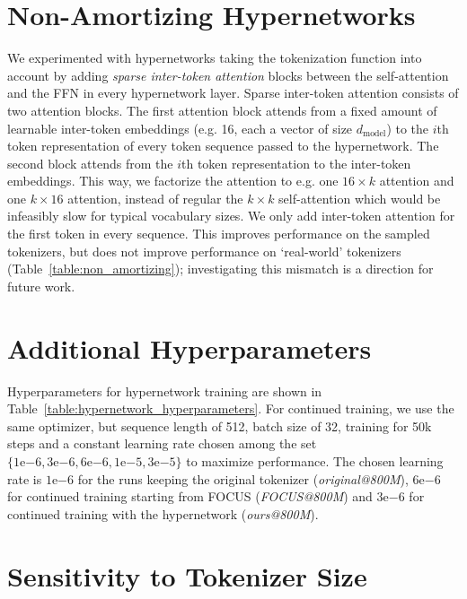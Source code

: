\documentclass{article}
\begin{document}
\section{Non-Amortizing Hypernetworks}
\label{appendix:nonamortizing}



We experimented with hypernetworks taking the tokenization function into account by adding \textit{sparse inter-token attention} blocks between the self-attention and the FFN in every hypernetwork layer. Sparse inter-token attention consists of two attention blocks. The first attention block attends from a fixed amount of learnable inter-token embeddings (e.g. 16, each a vector of size $d_{\text{model}}$) to the $i$th token representation of every token sequence passed to the hypernetwork. The second block attends from the $i$th token representation to the inter-token embeddings. This way, we factorize the attention to e.g. one $16 \times k$ attention and one $k \times 16$ attention, instead of regular the $k \times k$ self-attention which would be infeasibly slow for typical vocabulary sizes. We only add inter-token attention for the first token in every sequence. This improves performance on the sampled tokenizers, but does not improve performance on `real-world' tokenizers (Table~\ref{table:non_amortizing}); investigating this mismatch is a direction for future work.

\section{Additional Hyperparameters}
\label{appendix:hyperparameters}

Hyperparameters for hypernetwork training are shown in Table~\ref{table:hypernetwork_hyperparameters}.
For continued training, we use the same optimizer, but sequence length of 512, batch size of 32, training for 50k steps and a constant learning rate chosen among the set $\{1\mathrm{e}{-6},3\mathrm{e}{-6},6\mathrm{e}{-6},1\mathrm{e}{-5},3\mathrm{e}{-5}\}$ to maximize performance. The chosen learning rate is $1\mathrm{e}{-6}$ for the runs keeping the original tokenizer (\textit{original@800M}), $6\mathrm{e}{-6}$ for continued training starting from FOCUS (\textit{FOCUS@800M}) and $3\mathrm{e}{-6}$ for continued training with the hypernetwork (\textit{ours@800M}).



\section{Sensitivity to Tokenizer Size}
\label{appendix:tokenizer_size}
\end{document}
